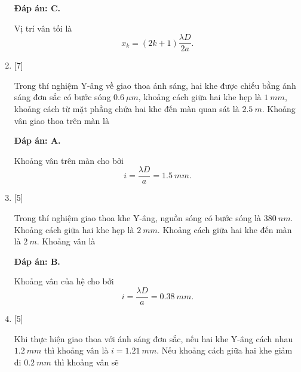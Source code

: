 \begin{enumerate}[label=\bfseries Câu \arabic*:]
	\loigiai
	{		\textbf{Đáp án: C.}
		
		Vị trí vân tối là 
		$$
		x_{k} = (2k+1) \dfrac{\lambda D}{2a}.
		$$
	}
	
	\item {} [7]
	\cauhoi
	{Trong thí nghiệm Y-âng về giao thoa ánh sáng, hai khe được chiếu bằng ánh sáng đơn sắc có bước sóng $\SI{0,6}{\mu m}$, khoảng cách giữa hai khe hẹp là $\SI{1}{mm}$, khoảng cách từ mặt phẳng chứa hai khe đến màn quan sát là $\SI{2,5}{m}$. Khoảng vân giao thoa trên màn là
		
	}
	
	\loigiai
	{		\textbf{Đáp án: A.}
		
		Khoảng vân trên màn cho bởi
		$$
		i = \dfrac{\lambda D}{a} = \SI{1,5}{mm}.
		$$
	}
	
	
	\item {} [5]
	\cauhoi
	{Trong thí nghiệm giao thoa khe Y-âng, nguồn sóng có bước sóng là $\SI{380}{nm}$.  Khoảng cách giữa hai khe hẹp là $\SI{2}{mm}$. Khoảng cách giữa hai khe đến màn là $\SI{2}{m}$. Khoảng vân là
	}
	
	\loigiai
	{		\textbf{Đáp án: B.}
		
		Khoảng vân của hệ cho bởi
		$$
		i = \dfrac{\lambda D}{a} = \SI{0,38}{mm}.
		$$
	}
	
	\item {} [5]
	\cauhoi
	{Khi thực hiện giao thoa với ánh sáng đơn sắc, nếu hai khe Y-âng cách nhau $\SI{1,2}{mm}$ thì khoảng vân là $i = \SI{1,21}{mm}$. Nếu khoảng cách giữa hai khe giảm đi $\SI{0,2}{mm}$ thì khoảng vân sẽ 
	}
	

\end{enumerate}
